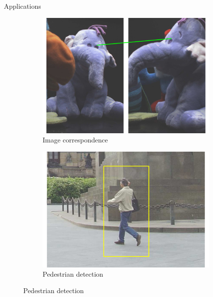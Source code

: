 \documentclass[14pt,t]{beamer}
\begin{document}
%
\begin{frame}[c]{Applications}
\begin{figure}
\centering
	\begin{subfigure}[t]{0.49\textwidth}
		\includegraphics[width=\textwidth]{img/introductionIC.pdf}
		\caption{Image correspondence}
	\end{subfigure}
	\begin{subfigure}[t]{0.49\textwidth}
		\includegraphics[width=\textwidth]{img/introductionOD.pdf}
		\caption{Pedestrian detection}
	\end{subfigure}
\end{figure}
\end{frame}
%
\end{document}
